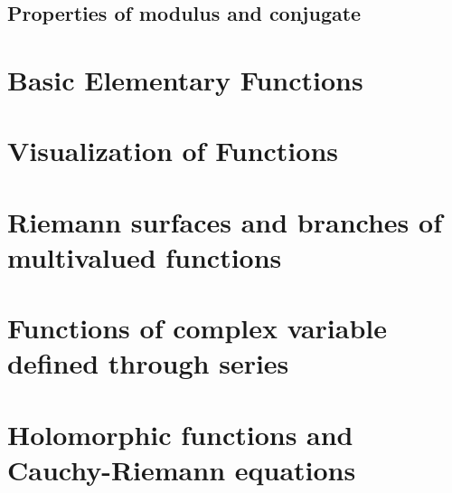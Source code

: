 \documentclass[12pt]{article}
\begin{document}
\subsection{Properties of modulus and conjugate}%
\label{sub:properties_of_modulus_and_conjugate}



\section{Basic Elementary Functions}%
\label{sec:basic_elementary_functions}

\section{Visualization of Functions}%
\label{sec:visualization_of_functions}

\section{Riemann surfaces and branches of multivalued functions}%
\label{sec:riemann_surfaces_and_branches_of_multivalued_functions}

\section{Functions of complex variable defined through series}%
\label{sec:functions_of_complex_variable_defined_through_series}

\section{Holomorphic functions and Cauchy-Riemann equations}%
\label{sec:holomorphic_functions_and_cauchy_riemann_equations}
\end{document}
